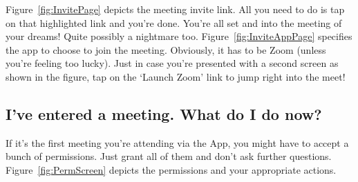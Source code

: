 \documentclass[14pt]{report}
\begin{document}
                            Figure~\ref{fig:InvitePage} depicts the meeting invite link. All you need to do is tap on that highlighted link and you're done. You're all set and into the meeting of your dreams! Quite possibly a nightmare too. Figure~\ref{fig:InviteAppPage} specifies the app to choose to join the meeting. Obviously, it has to be Zoom (unless you're feeling too lucky). Just in case you're presented with a second screen as shown in the figure, tap on the `Launch Zoom' link to jump right into the meet!


                        
                    \subsection{I've entered a meeting. What do I do now?}
                            If it's the first meeting you're attending via the App, you might have to accept a bunch of permissions. Just grant all of them and don't ask further questions. Figure~\ref{fig:PermScreen} depicts the permissions and your appropriate actions.\\
\end{document}
